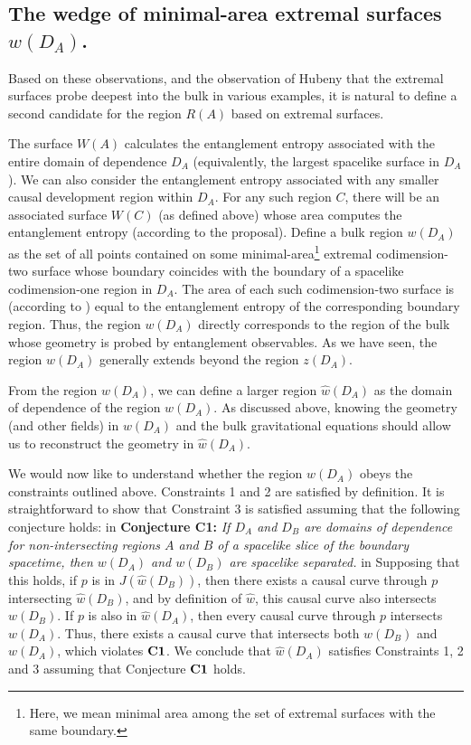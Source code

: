 \documentclass[12pt]{article}
\renewcommand{\(}{\left(}
\renewcommand{\)}{\right)}
\begin{document}
\subsection{The wedge of minimal-area extremal surfaces $w(D_A)$.}

Based on these observations, and the observation of Hubeny that the extremal surfaces probe deepest into the bulk in various examples, it is natural to define a second candidate for the region $R(A)$ based on extremal surfaces.

The surface $W(A)$ calculates the entanglement entropy associated with the entire domain of dependence $D_A$ (equivalently, the largest spacelike surface in $D_A$). We can also consider the entanglement entropy associated with any smaller causal development region within $D_A$. For any such region $C$, there will be an associated surface $W(C)$ (as defined above) whose area computes the entanglement entropy (according to the proposal). Define a bulk region $w(D_A)$ as the set of all points contained on some minimal-area\footnote{Here, we mean minimal area among the set of extremal surfaces with the same boundary.} extremal codimension-two surface whose boundary coincides with the boundary of a spacelike codimension-one region in $D_A$. The area of each such codimension-two surface is (according to \cite{Hubeny:2007xt}) equal to the entanglement entropy of the corresponding boundary region. Thus, the region  $w(D_A)$ directly corresponds to the region of the bulk whose geometry is probed by entanglement observables. As we have seen, the region $w(D_A)$ generally extends beyond the region $z(D_A)$.

From the region $w(D_A)$, we can define a larger region $\hat{w}(D_A)$ as the domain of dependence of the region $w(D_A)$. As discussed above, knowing the geometry (and other fields) in $w(D_A)$ and the bulk gravitational equations should allow us to reconstruct the geometry in $\hat{w}(D_A)$.

We would now like to understand whether the region $\hat{w}(D_A)$ obeys the constraints outlined above. Constraints 1 and 2 are satisfied by definition. It is straightforward to show that Constraint 3 is satisfied assuming that the following conjecture holds:
 in
\noindent
{\bf Conjecture C1:}  {\it If $D_A$ and $D_B$ are domains of dependence for non-intersecting regions $A$ and $B$ of a spacelike slice of the boundary spacetime, then $w(D_A)$ and $w(D_B)$ are spacelike separated.}
 in
\noindent
Supposing that this holds, if $p$ is in $J(\hat{w}(D_B))$, then there exists a causal curve through $p$ intersecting $\hat{w}(D_B)$, and by definition of $\hat{w}$, this causal curve also intersects $w(D_B)$. If $p$ is also in $\hat{w}(D_A)$, then every causal curve through $p$ intersects $w(D_A)$. Thus, there exists a causal curve that intersects both $w(D_B)$ and $w(D_A)$, which violates ${\bf C1}$. We conclude that  $\hat{w}(D_A)$ satisfies Constraints 1, 2 and 3 assuming that Conjecture ${\bf C1}$ holds.
\end{document}
